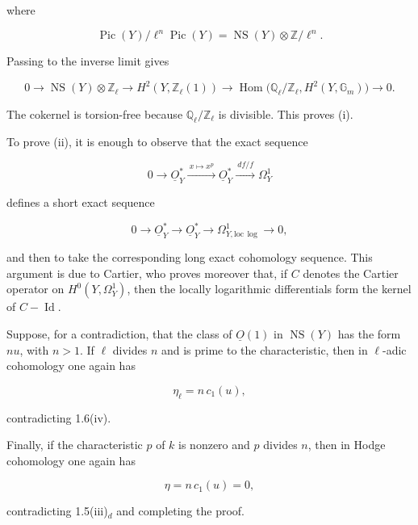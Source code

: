 where

\begin{equation*}
\operatorname{Pic}(Y)/\ell^n\operatorname{Pic}(Y)
=\operatorname{NS}(Y)\otimes\mathbb Z/\ell^n.
\end{equation*}

Passing to the inverse limit gives

\begin{equation*}
0\longrightarrow\operatorname{NS}(Y)\otimes\mathbb Z_\ell
\longrightarrow H^2(Y,\mathbb Z_\ell(1))
\longrightarrow
\operatorname{Hom}\bigl(\mathbb Q_\ell/\mathbb Z_\ell,
H^2(Y,\mathbb G_m)\bigr)
\longrightarrow0.
\end{equation*}

The cokernel is torsion-free because $\mathbb Q_\ell/\mathbb Z_\ell$ is
divisible.  This proves (i).

To prove (ii), it is enough to observe that the exact sequence

\begin{equation*}
0\longrightarrow\underline O_Y^*
\xrightarrow{\ x\mapsto x^p\ }\underline O_Y^*
\xrightarrow{\ df/f\ }\Omega_Y^1
\end{equation*}

defines a short exact sequence

\begin{equation*}
0\longrightarrow\underline O_Y^*\longrightarrow\underline O_Y^*
\longrightarrow\Omega^1_{Y,\mathrm{loc}\,\log}\longrightarrow0,
\end{equation*}

and then to take the corresponding long exact cohomology sequence.  This
argument is due to Cartier, who proves moreover that, if $C$ denotes the
Cartier operator on $H^0(Y,\Omega_Y^1)$, then the locally logarithmic
differentials form the kernel of $C-\operatorname{Id}$.

Suppose, for a contradiction, that the class of $\underline O(1)$ in
$\operatorname{NS}(Y)$ has the form $nu$, with $n>1$.  If $\ell$ divides
$n$ and is prime to the characteristic, then in $\ell$-adic cohomology one
again has


\begin{equation*}
\eta_\ell=n\,c_1(u),
\end{equation*}

contradicting 1.6(iv).

Finally, if the characteristic $p$ of $k$ is nonzero and $p$ divides $n$,
then in Hodge cohomology one again has

\begin{equation*}
\eta=n\,c_1(u)=0,
\end{equation*}

contradicting 1.5(iii)$_d$ and completing the proof.

